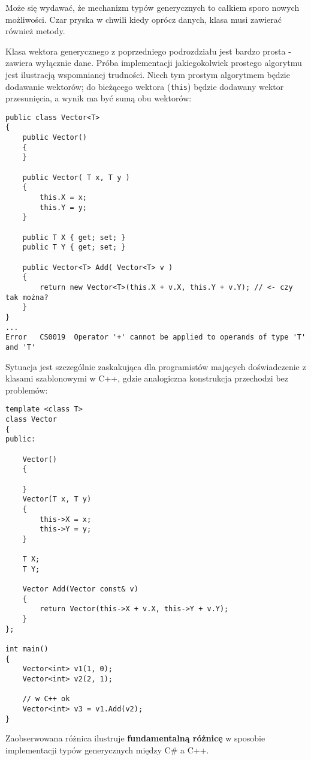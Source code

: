 Może się wydawać, że mechanizm typów generycznych to całkiem sporo nowych możliwości. Czar pryska w chwili
kiedy oprócz danych, klasa musi zawierać również metody.

Klasa wektora generycznego z poprzedniego podrozdziału jest bardzo prosta - zawiera wyłącznie dane.
Próba implementacji jakiegokolwiek prostego algorytmu jest ilustracją wspomnianej trudności. Niech tym prostym
algorytmem będzie dodawanie wektorów; do bieżącego wektora ({\tt this}) będzie dodawany wektor przesunięcia, a wynik
ma być sumą obu wektorów:

\begin{scriptsize}
\begin{verbatim}
public class Vector<T>
{
    public Vector()
    {
    }

    public Vector( T x, T y )
    {
        this.X = x;
        this.Y = y;
    }

    public T X { get; set; }
    public T Y { get; set; }

    public Vector<T> Add( Vector<T> v )
    {
        return new Vector<T>(this.X + v.X, this.Y + v.Y); // <- czy tak można?
    }
}
...
Error	CS0019	Operator '+' cannot be applied to operands of type 'T' and 'T'	
\end{verbatim}
\end{scriptsize}

Sytuacja jest szczególnie zaskakująca dla programistów mających doświadczenie z klasami szablonowymi w C++, gdzie
analogiczna konstrukcja przechodzi bez problemów:

\begin{scriptsize}
\begin{verbatim}
template <class T> 
class Vector
{
public:

    Vector()
    {

    }
    Vector(T x, T y)
    {
        this->X = x;
        this->Y = y;
    }

    T X;
    T Y;

    Vector Add(Vector const& v)
    {
        return Vector(this->X + v.X, this->Y + v.Y);
    }
};

int main()
{
    Vector<int> v1(1, 0);
    Vector<int> v2(2, 1);

    // w C++ ok
    Vector<int> v3 = v1.Add(v2);
}
\end{verbatim}
\end{scriptsize}

Zaobserwowana różnica ilustruje {\bf fundamentalną różnicę} w sposobie implementacji typów generycznych między
C\# a C++.

